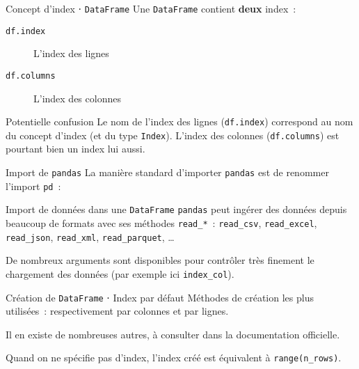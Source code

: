 \begin{frame}{Concept d'index ⋅ \texttt{DataFrame}}
  Une \texttt{DataFrame} contient \textbf{deux} index~:
  \begin{description}
    \item[\texttt{df.index}] L'index des lignes
    \item[\texttt{df.columns}] L'index des colonnes
  \end{description}


  \begin{alertblock}{Potentielle confusion}
    Le nom de l'index des lignes (\texttt{df.index}) correspond au nom du concept d'index (et du type \texttt{Index}).
    L'index des colonnes (\texttt{df.columns}) est pourtant bien un index lui aussi.
  \end{alertblock}
\end{frame}

\begin{frame}{Import de \texttt{pandas}}
  La manière standard d'importer \texttt{pandas} est de renommer l'import \texttt{pd}~:
\end{frame}

\begin{frame}{Import de données dans une \texttt{DataFrame}}
  \texttt{pandas} peut ingérer des données depuis beaucoup de formats avec ses méthodes \texttt{read\_*}~: \texttt{read\_csv}, \texttt{read\_excel}, \texttt{read\_json}, \texttt{read\_xml}, \texttt{read\_parquet}, …


  De nombreux arguments sont disponibles pour contrôler très finement le chargement des données (par exemple ici \texttt{index\_col}).
\end{frame}

\begin{frame}{Création de \texttt{DataFrame} ⋅ Index par défaut}
  Méthodes de création les plus utilisées~: respectivement par colonnes et par lignes.


  Il en existe de nombreuses autres, à consulter dans la documentation officielle.

  Quand on ne spécifie pas d'index, l'index créé est équivalent à \texttt{range(n\_rows)}.
\end{frame}

